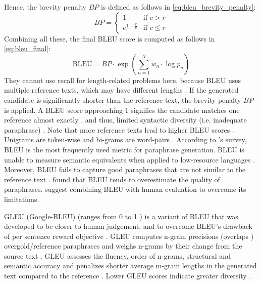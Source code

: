 Hence, the brevity penalty $BP$ is defined as follows in \autoref{eq:bleu_brevity_penalty}:
\begin{equation}
    BP = \begin{cases}
        1 & \text{if } c > r \\
        e^{1 - \frac{r}{c}} & \text{if } c \leq r
    \end{cases}
\label{eq:bleu_brevity_penalty}
\end{equation}
Combining all these, the final BLEU score is computed as follows in \autoref{eq:bleu_final}:
\begin{equation}
    \text{BLEU} = BP \cdot \exp\left(\sum_{n=1}^{N} w_n \cdot \log p_n\right)
\label{eq:bleu_final}
\end{equation}
They cannot use recall for length-related problems here, because BLEU uses multiple reference texts, which may have different lengths \cite{papineni_bleu_2001,banerjee_METEOR_2005}.
If the generated candidate is significantly shorter than the reference text, the brevity penalty $BP$ is applied.
A BLEU score approaching 1 signifies the candidate matches one reference almost exactly \cite{papineni_bleu_2001}, 
and thus, limited syntactic diversity (i.e. inadequate paraphrase) \cite{kurt_pehlivanoglu_comparative_2024}.
Note that more reference texts lead to higher BLEU scores \cite{papineni_bleu_2001}.
Unigrams are token-wise and bi-grams are word-pairs \citet{palivela_optimization_2021}.
According to \citet{zhou_paraphrase_2021}'s survey, BLEU is the most frequently used metric for paraphrase generation.
BLEU is unable to measure semantic equivalents \cite{kurt_pehlivanoglu_comparative_2024,zhou_paraphrase_2021} 
when applied to low-resource languages \cite{zhou_paraphrase_2021}.
Moreover, BLEU fails to capture good paraphrases that are not similar to the reference text \cite{zhou_paraphrase_2021}.
\citet{kurt_pehlivanoglu_comparative_2024} found that BLEU tends to overestimate the quality of paraphrases.
\citet{zhou_paraphrase_2021} suggest combining BLEU with human evaluation to overcome its limitations.

GLEU (Google-BLEU) (ranges from 0 to 1 \cite{kurt_pehlivanoglu_comparative_2024}) is a variant of BLEU that was developed to be closer to human judgement, and to 
overcome BLEU's drawback of per sentence reward objective \cite{palivela_optimization_2021}.
GLEU computes n-gram precisions (overlaps \cite{kurt_pehlivanoglu_comparative_2024}) overgold/reference paraphrases 
and weighs n-grams by their change from the source text \cite{palivela_optimization_2021}.
GLEU assesses the fluency, order of n-grams, structural and semantic accuracy 
and penalizes shorter average m-gram lengths in the generated text compared to the reference \cite{kurt_pehlivanoglu_comparative_2024}.
Lower GLEU scores indicate greater diversity \cite{kurt_pehlivanoglu_comparative_2024}.

